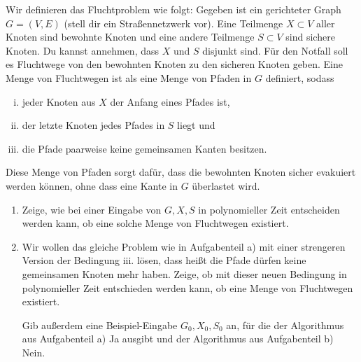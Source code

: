 \documentclass{uebung_cs}
\begin{document}
\begin{aufgabe}[Fluchtwege]
    Wir definieren das Fluchtproblem wie folgt: Gegeben ist ein gerichteter Graph $G = (V,E)$ (stell dir ein Straßennetzwerk vor). Eine Teilmenge $X \subset V$ aller Knoten sind bewohnte Knoten und eine andere Teilmenge $S \subset V$ sind sichere Knoten. Du kannst annehmen, dass $X$ und $S$ disjunkt sind. Für den Notfall soll es Fluchtwege von den bewohnten Knoten zu den sicheren Knoten geben. Eine Menge von Fluchtwegen ist als eine Menge von Pfaden in $G$ definiert, sodass
    \begin{enumerate}[i.]
      \item jeder Knoten aus $X$ der Anfang eines Pfades ist,
      \item der letzte Knoten jedes Pfades in $S$ liegt und
      \item die Pfade paarweise keine gemeinsamen Kanten besitzen.   
    \end{enumerate}
    Diese Menge von Pfaden sorgt dafür, dass die bewohnten Knoten sicher evakuiert werden können, ohne dass eine Kante in $G$ überlastet wird.
    \begin{enumerate}
    	\item Zeige, wie bei einer Eingabe von $G, X, S$ in polynomieller Zeit entscheiden werden kann, ob eine solche Menge von Fluchtwegen existiert.
    	\item Wir wollen das gleiche Problem wie in Aufgabenteil a) mit einer strengeren Version der Bedingung iii. lösen, dass heißt die Pfade dürfen keine gemeinsamen Knoten mehr haben.
    	Zeige, ob mit dieser neuen Bedingung in polynomieller Zeit entschieden werden kann, ob eine Menge von Fluchtwegen existiert.
    	
    	Gib außerdem eine Beispiel-Eingabe $G_0, X_0, S_0$ an, für die der Algorithmus aus Aufgabenteil a) \glqq Ja\grqq{} ausgibt und der Algorithmus aus Aufgabenteil b) \glqq Nein\grqq.
    \end{enumerate}
\end{aufgabe}
\end{document}
